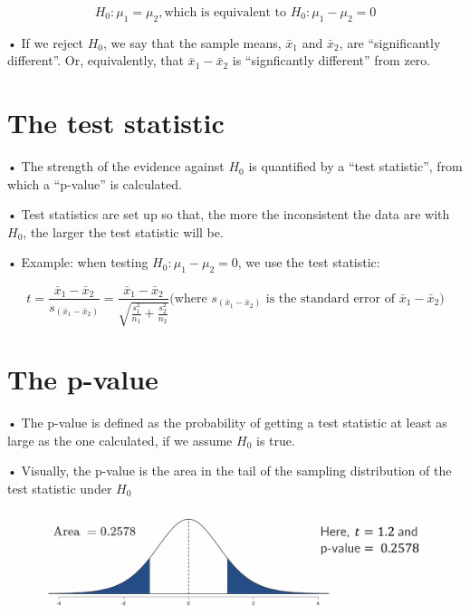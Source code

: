 \documentclass[
  letterpaper,
  DIV=11,
  numbers=noendperiod]{scrreprt}
\begin{document}
\[
H_0: \mu_1 = \mu_2,\text{which is equivalent to }H_0: \mu_1 − \mu_2 = 0
\]

• If we reject \(H_0\), we say that the sample means, \(\bar{x}_1\) and
\(\bar{x}_2\), are ``significantly different''. Or, equivalently, that
\(\bar{x}_1 - \bar{x}_2\) is ``signficantly different'' from zero.

\hypertarget{the-test-statistic}{%
\section{The test statistic}\label{the-test-statistic}}

• The strength of the evidence against \(H_0\) is quantified by a ``test
statistic'', from which a ``p-value'' is calculated.

• Test statistics are set up so that, the more the inconsistent the data
are with \(H_0\), the larger the test statistic will be.

• Example: when testing \(H_0: \mu_1 − \mu_2 = 0\), we use the test
statistic:

\[
t = \frac{\bar{x}_1 - \bar{x}_2}{s_{(\bar{x}_1 - \bar{x}_2)}} = \frac{\bar{x}_1 - \bar{x}_2}{\sqrt{\frac{s_1^2}{n_1} + \frac{s_2^2}{n_2}}} \text{(where } s_{(\bar{x}_1 - \bar{x}_2)}\text{ is the standard error of }\bar{x}_1 - \bar{x}_2)
\]

\hypertarget{the-p-value}{%
\section{The p-value}\label{the-p-value}}

• The p-value is defined as the probability of getting a test statistic
at least as large as the one calculated, if we assume \(H_0\) is true.

• Visually, the p-value is the area in the tail of the sampling
distribution of the test statistic under \(H_0\)

\begin{figure}

{\centering \includegraphics{images/mod1_11.png}

}

\end{figure}
\end{document}

